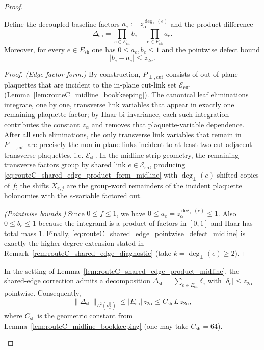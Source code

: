 \begin{proof}
\begin{lemma}
Define the decoupled baseline factors $a_e:=z_\alpha^{\deg_\perp(e)}$ and the product difference
\begin{equation}\label{eq:routeC_Delta_sh_product_difference_midline}
\Delta_{\mathrm{sh}}
=
\prod_{e\in E_{\mathrm{sh}}} b_e - \prod_{e\in E_{\mathrm{sh}}} a_e.
\end{equation}
Moreover, for every $e\in E_{\mathrm{sh}}$ one has $0\le a_e,b_e\le 1$ and the pointwise defect bound
\begin{equation}\label{eq:routeC_shared_edge_pointwise_defect_midline}
|b_e-a_e|\le z_{2\alpha}.
\end{equation}
\end{lemma}

\begin{proof}
\emph{(Edge-factor form.)}
By construction, $P_{\perp,\mathrm{cut}}$ consists of out-of-plane plaquettes that are incident to the in-plane cut-link set $\mathcal E_{\mathrm{cut}}$
(Lemma~\ref{lem:routeC_midline_bookkeeping}).
The canonical leaf eliminations integrate, one by one, transverse link variables that appear in exactly one remaining plaquette factor; by Haar bi-invariance,
each such integration contributes the constant $z_\alpha$ and removes that plaquette-variable dependence.
After all such eliminations, the only transverse link variables that remain in $P_{\perp,\mathrm{cut}}$ are precisely the non-in-plane links incident
to at least two cut-adjacent transverse plaquettes, i.e. $\mathcal E_{\mathrm{sh}}$.
In the midline strip geometry, the remaining transverse factors group by shared link $e\in \mathcal E_{\mathrm{sh}}$, producing
\eqref{eq:routeC_shared_edge_product_form_midline} with $\deg_\perp(e)$ shifted copies of $f$; the shifts $X_{e,j}$ are the group-word remainders
of the incident plaquette holonomies with the $e$-variable factored out.

\smallskip
\emph{(Pointwise bounds.)}
Since $0\le f\le 1$, we have $0\le a_e=z_\alpha^{\deg_\perp(e)}\le 1$.
Also $0\le b_e\le 1$ because the integrand is a product of factors in $[0,1]$ and Haar has total mass $1$.
Finally, \eqref{eq:routeC_shared_edge_pointwise_defect_midline} is exactly the higher-degree extension stated in
Remark~\ref{rem:routeC_shared_edge_diagnostic} (take $k=\deg_\perp(e)\ge 2$).
\end{proof}

\begin{corollary}\label{cor:routeC_shared_edge_L2_midline}
In the setting of Lemma~\ref{lem:routeC_shared_edge_product_midline}, the shared-edge correction admits a decomposition
\(
\Delta_{\mathrm{sh}}=\sum_{e\in E_{\mathrm{sh}}}\delta_e
\)
with $|\delta_e|\le z_{2\alpha}$ pointwise. Consequently,
\[
\|\Delta_{\mathrm{sh}}\|_{L^2(\nu_L^{\parallel})}
\le |E_{\mathrm{sh}}|\,z_{2\alpha}
\le C_{\mathrm{sh}}\,L\,z_{2\alpha},
\]
where $C_{\mathrm{sh}}$ is the geometric constant from Lemma~\ref{lem:routeC_midline_bookkeeping} (one may take $C_{\mathrm{sh}}=64$).
\end{corollary}


\end{proof}
